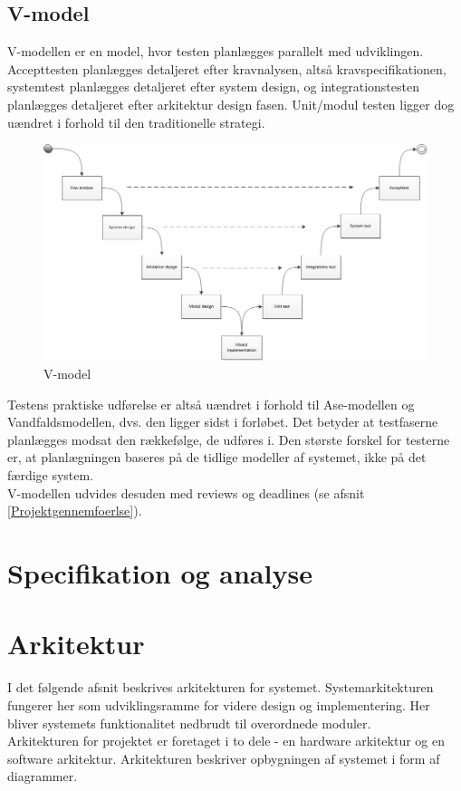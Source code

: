 \subsection{V-model}
V-modellen er en model, hvor testen planlægges parallelt med udviklingen. Accepttesten planlægges detaljeret efter kravnalysen, altså kravspecifikationen, systemtest planlægges detaljeret efter system design, og integrationstesten planlægges detaljeret efter arkitektur design fasen. Unit/modul testen ligger dog uændret i forhold til den traditionelle strategi.
\begin{figure}[H]
	\centering
	\includegraphics[width=1\textwidth]{Figurer/Metode/Vmodel}
	\caption{V-model}
	\label{Vmodel}
\end{figure}
Testens praktiske udførelse er altså uændret i forhold til Ase-modellen og Vandfaldsmodellen, dvs. den ligger sidst i forløbet. Det betyder at testfaserne planlægges modsat den rækkefølge, de udføres i. Den største forskel for testerne er, at planlægningen baseres på de tidlige modeller af systemet, ikke på det færdige system. \\
 V-modellen udvides desuden med reviews og deadlines (se afsnit \ref{Projektgennemfoerlse}).

\section{Specifikation og analyse}



\section{Arkitektur}
I det følgende afsnit beskrives arkitekturen for systemet. Systemarkitekturen fungerer her som udviklingsramme for videre design og implementering. Her bliver systemets funktionalitet 
nedbrudt til overordnede moduler. \\
   Arkitekturen for projektet er foretaget i to dele - en hardware arkitektur og en software arkitektur. Arkitekturen beskriver opbygningen af systemet i form af diagrammer.  
